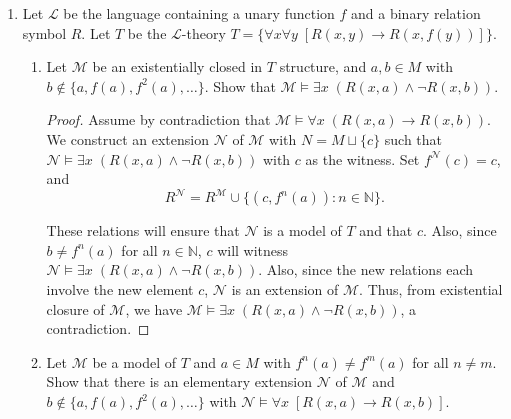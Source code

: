 \documentclass{article}
\begin{document}
\begin{enumerate}[label={\bf Q\arabic*:}]
\begin{proof}
      Now consider the case where $\mathcal{M}$ is finite. Write
      $M=\{m_1,\ldots,m_n\}$. Then $\mathcal{N}_0\geq\mathcal{M}$ must also
      have $n$-elements, otherwise the existential-formula
      \[\exists x\; (x\neq m_1\wedge \ldots\wedge x\neq m_n)\]
      will be satisfied by $\mathcal{N}_0$ and not by $\mathcal{M}$, and
      then $\mathcal{M}$ cannot be ec-closed in $\mathcal{N}_0$.
    \end{proof}

  \item Let $\mathcal{L}$ be the language containing a unary function $f$
    and a binary relation symbol $R$. Let $T$ be the $\mathcal{L}$-theory
    $T=\{\forall x\forall y\; [R(x,y)\rightarrow R(x,f(y))]\}$.

    \begin{enumerate}
      \item Let $\mathcal{M}$ be an existentially closed in $T$ structure,
        and $a,b\in M$ with $b\not\in\{a,f(a),f^2(a),\ldots\}$. Show that
        $\mathcal{M}\models \exists x\; (R(x,a)\wedge\neg R(x,b))$.

        \begin{proof}
          Assume by contradiction that $\mathcal{M}\models \forall x\;
          (R(x,a)\rightarrow R(x,b))$. We construct an extension
          $\mathcal{N}$ of $\mathcal{M}$ with $N=M\sqcup\{c\}$
          such that $\mathcal{N}\models \exists x\; (R(x,a)\wedge\neg
          R(x,b))$ with $c$ as the witness. Set $f^\mathcal{N}(c)=c$, and
          \[R^\mathcal{N}= R^\mathcal{M} \cup
          \{(c,f^n(a)):n\in\mathbb{N}\}.\]

          These relations will ensure that $\mathcal{N}$ is a model of $T$
          and that $c$. Also, since $b\neq f^n(a)$ for all
          $n\in\mathbb{N}$, $c$ will witness $\mathcal{N}\models \exists x\;
          (R(x,a)\wedge\neg R(x,b))$. Also, since the new relations each
          involve the new element $c$, $\mathcal{N}$ is an extension of
          $\mathcal{M}$. Thus, from existential closure of $\mathcal{M}$,
          we have $\mathcal{M}\models \exists x\; (R(x,a)\wedge\neg
          R(x,b))$, a contradiction.
        \end{proof}

      \item Let $\mathcal{M}$ be a model of $T$ and $a\in M$ with
        $f^n(a)\neq f^m(a)$ for all $n\neq m$. Show that there is an
        elementary extension $\mathcal{N}$ of $\mathcal{M}$ and
        $b\not\in\{a,f(a),f^2(a),\ldots\}$ with $\mathcal{N}\models\forall
        x\; [R(x,a)\rightarrow R(x,b)]$.


\end{enumerate}
\end{enumerate}
\end{document}
